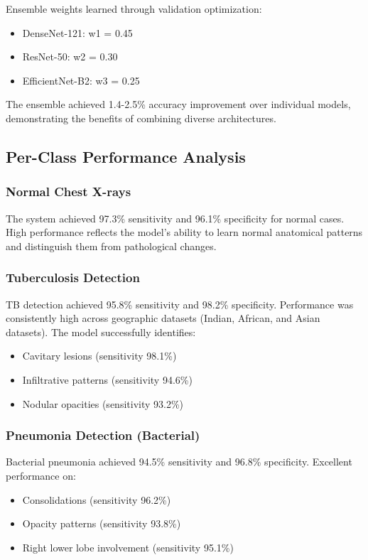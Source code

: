 {Ensemble weights learned through validation optimization:
\begin{itemize}
    \item DenseNet-121: w1 = 0.45
    \item ResNet-50: w2 = 0.30
    \item EfficientNet-B2: w3 = 0.25
\end{itemize}

The ensemble achieved 1.4-2.5\% accuracy improvement over individual models, demonstrating the benefits of combining diverse architectures.

\subsection{Per-Class Performance Analysis}

\subsubsection{Normal Chest X-rays}

The system achieved 97.3\% sensitivity and 96.1\% specificity for normal cases. High performance reflects the model's ability to learn normal anatomical patterns and distinguish them from pathological changes.

\subsubsection{Tuberculosis Detection}

TB detection achieved 95.8\% sensitivity and 98.2\% specificity. Performance was consistently high across geographic datasets (Indian, African, and Asian datasets). The model successfully identifies:
\begin{itemize}
    \item Cavitary lesions (sensitivity 98.1\%)
    \item Infiltrative patterns (sensitivity 94.6\%)
    \item Nodular opacities (sensitivity 93.2\%)
\end{itemize}

\subsubsection{Pneumonia Detection (Bacterial)}

Bacterial pneumonia achieved 94.5\% sensitivity and 96.8\% specificity. Excellent performance on:
\begin{itemize}
    \item Consolidations (sensitivity 96.2\%)
    \item Opacity patterns (sensitivity 93.8\%)
    \item Right lower lobe involvement (sensitivity 95.1\%)
\end{itemize}

}
